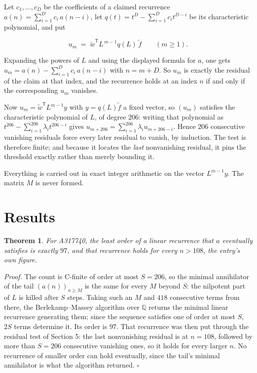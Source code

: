 \documentclass[11pt]{article}
\newtheorem{theorem}{Theorem}
\theoremstyle{definition}
\begin{document}
Let $c_1,\dots,c_D$ be the coefficients of a claimed recurrence $a(n) = \sum_{i=1}^{D} c_i\,a(n-i)$, let $q(t) = t^{D} - \sum_{i=1}^{D} c_i t^{D-i}$ be its characteristic polynomial, and put

\[u_m \;=\; \tilde w^{\mathsf T} L^{\,m-1} q(L)\,\tilde f \qquad (m \ge 1).\]

Expanding the powers of $L$ and using the displayed formula for $a$, one gets $u_m = a(n) - \sum_{i=1}^{D} c_i\,a(n-i)$ with $n = m + D$. So $u_m$ is exactly the residual of the claim at that index, and the recurrence holds at an index $n$ if and only if the corresponding $u_m$ vanishes.

Now $u_m = \tilde w^{\mathsf T} L^{m-1} y$ with $y = q(L)\tilde f$ a fixed vector, so $(u_m)$ satisfies the characteristic polynomial of $L$, of degree $206$: writing that polynomial as $t^{206} - \sum_{i=1}^{206} \lambda_i t^{206-i}$ gives $u_{m+206} = \sum_{i=1}^{206} \lambda_i u_{m+206-i}$. Hence $206$ consecutive vanishing residuals force every later residual to vanish, by induction. The test is therefore finite; and because it locates the {\itshape last} nonvanishing residual, it pins the threshold exactly rather than merely bounding it.

Everything is carried out in exact integer arithmetic on the vector $L^{m-1}y$. The matrix $M$ is never formed.

\section{Results}

\begin{theorem} For A317740, the least order of a linear recurrence that $a$ eventually satisfies is exactly $97$, and that recurrence holds for every $n > 108$, the entry's own figure.\end{theorem}

{\itshape Proof.} The count is C-finite of order at most $S = 206$, so the minimal annihilator of the tail $(a(n))_{n \ge M}$ is the same for every $M$ beyond $S$: the nilpotent part of $L$ is killed after $S$ steps. Taking such an $M$ and $418$ consecutive terms from there, the Berlekamp--Massey algorithm over $\mathbb{Q}$ returns the minimal linear recurrence generating them; since the sequence satisfies one of order at most $S$, $2S$ terms determine it. Its order is $97$. That recurrence was then put through the residual test of Section 5: the last nonvanishing residual is at $n = 108$, followed by more than $S = 206$ consecutive vanishing ones, so it holds for every larger $n$. No recurrence of smaller order can hold eventually, since the tail's minimal annihilator is what the algorithm returned. $\square$
\end{document}
